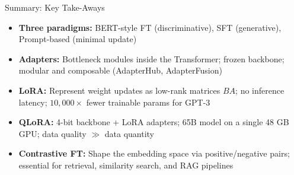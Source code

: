 \documentclass[11pt,compress,t,notes=noshow, xcolor=table]{beamer}
\begin{document}

\begin{frame}{Summary: Key Take-Aways}

\vfill

\begin{itemize}
  \item \textbf{Three paradigms:} BERT-style FT (discriminative), SFT (generative), Prompt-based (minimal update)
  \item \textbf{Adapters:} Bottleneck modules inside the Transformer; frozen backbone; modular and composable (AdapterHub, AdapterFusion)
  \item \textbf{LoRA:} Represent weight updates as low-rank matrices $BA$; no inference latency; $10{,}000\times$ fewer trainable params for GPT-3
  \item \textbf{QLoRA:} 4-bit backbone + LoRA adapters; 65B model on a single 48 GB GPU; data quality $\gg$ data quantity
  \item \textbf{Contrastive FT:} Shape the embedding space via positive/negative pairs; essential for retrieval, similarity search, and RAG pipelines
\end{itemize}

\vfill

\end{frame}


\endlecture
\end{document}
